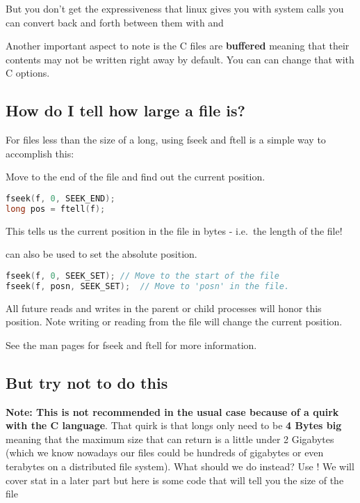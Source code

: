  But you don't get the expressiveness that linux gives you with system calls you can convert back and forth between them with  and  

 Another important aspect to note is the C files are \textbf{buffered} meaning that their contents may not be written right away by default. You can can change that with C options.

\subsection{How do I tell how large a file is?}\label{how-do-i-tell-how-large-a-file-is}

For files less than the size of a long, using fseek and ftell is a
simple way to accomplish this:

Move to the end of the file and find out the current position.

\begin{lstlisting}[language=C]
fseek(f, 0, SEEK_END);
long pos = ftell(f);
\end{lstlisting}

This tells us the current position in the file in bytes - i.e.~the
length of the file!

 can also be used to set the absolute position.

\begin{lstlisting}[language=C]
fseek(f, 0, SEEK_SET); // Move to the start of the file 
fseek(f, posn, SEEK_SET);  // Move to 'posn' in the file.
\end{lstlisting}

All future reads and writes in the parent or child processes will honor
this position. Note writing or reading from the file will change the
current position.

See the man pages for fseek and ftell for more information.

\subsection{But try not to do this}

\textbf{Note: This is not recommended in the usual case because of a quirk with the C language}. That quirk is that longs only need to be \textbf{4 Bytes big} meaning that the maximum size that  can return is a little under 2 Gigabytes (which we know nowadays our files could be hundreds of gigabytes or even terabytes on a distributed file system). What should we do instead? Use ! We will cover stat in a later part but here is some code that will tell you the size of the file

